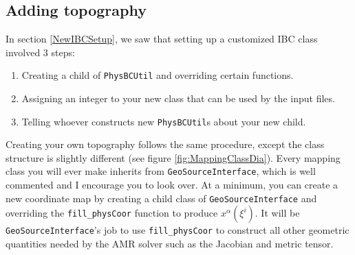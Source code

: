 \documentclass[12pt]{article}
\begin{document}
\subsection{Adding topography}
In section \ref{NewIBCSetup}, we saw that setting up a customized IBC class involved $3$ steps:
\begin{enumerate}
  \item Creating a child of \texttt{PhysBCUtil} and overriding certain functions.
  \item Assigning an integer to your new class that can be used by the input files.
  \item Telling whoever constructs new \texttt{PhysBCUtil}s about your new child.
\end{enumerate}
Creating your own topography follows the same procedure, except the class structure is slightly different (see figure \ref{fig:MappingClassDia}). Every mapping class you will ever make inherits from \texttt{GeoSourceInterface}, which is well commented and I encourage you to look over. At a minimum, you can create a new coordinate map by creating a child class of \texttt{GeoSourceInterface} and overriding the \texttt{fill\_physCoor} function to produce $x^{\alpha}(\xi^i)$. It will be \texttt{GeoSourceInterface}'s job to use \texttt{fill\_physCoor} to construct all other geometric quantities needed by the AMR solver such as the Jacobian and metric tensor.\\
\end{document}
